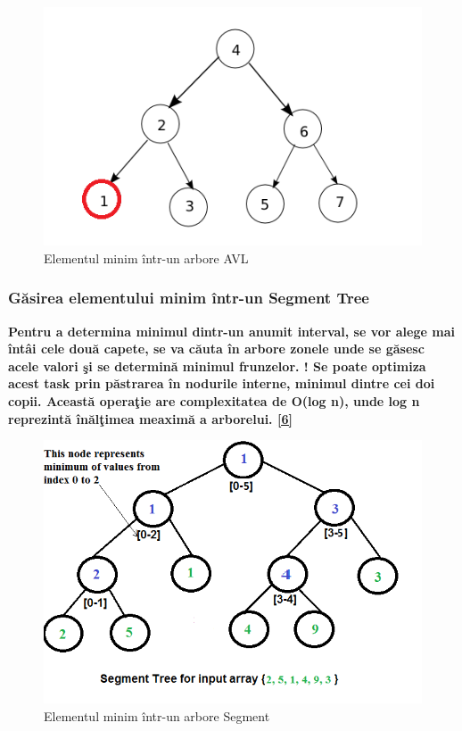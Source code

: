 \documentclass[12pt]{article}
\begin{document}
\begin{figure}[H]
\centering
\includegraphics[scale = 0.5]{AvlMin.png}
\caption{Elementul minim \^{i}ntr-un arbore AVL}
\end{figure}

\subsubsection{G\u{a}sirea elementului minim \^{i}ntr-un Segment Tree}

\textbf{\hspace{7mm} Pentru a determina minimul dintr-un anumit interval, se vor alege mai \^{i}nt\^{a}i cele dou\u{a} capete, se va c\u{a}uta \^{i}n arbore zonele unde se g\u{a}sesc acele valori \c{s}i se determin\u{a} minimul frunzelor. ! Se poate optimiza acest task prin p\u{a}strarea \^{i}n nodurile interne, minimul dintre cei doi copii. Aceast\u{a} opera\c{t}ie are complexitatea de O(log n), unde log n reprezint\u{a} \^{i}n\u{a}l\c{t}imea meaxim\u{a} a arborelui. \hyperlink{page.14}{[6]} }

\begin{figure}[H]
\centering
\includegraphics[scale = 0.45]{Minim.png}
\caption{Elementul minim \^{i}ntr-un arbore Segment}
\end{figure}
\end{document}
